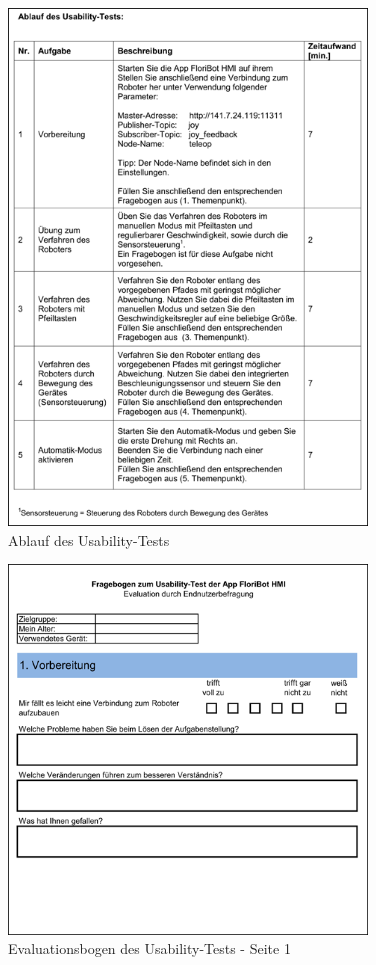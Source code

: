 \begin{figure}[H]
	\centering
		\includegraphics[width=0.85\textwidth]{03_Grafiken/Anhang/UsabilityBogen/UsabilityAblauf.png}
	\caption[Ablauf des Usability-Tests]{Ablauf des Usability-Tests}
	\label{fig:UsabilityAblauf}
\end{figure}
\begin{figure}[H]
	\centering
		\includegraphics[width=0.85\textwidth]{03_Grafiken/Anhang/UsabilityBogen/UsabilityEvaluationsbogen.png}
	\caption[Evaluationsbogen des Usability-Tests - Seite 1]{Evaluationsbogen des Usability-Tests - Seite 1}
	\label{fig:UsabilityEvaluationsbogen}
\end{figure}
